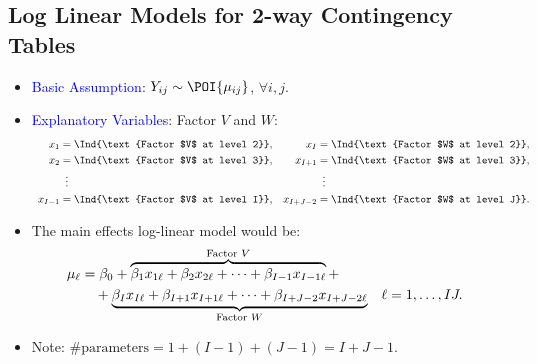 \documentclass[oneside]{book}\usepackage[]{graphicx}\usepackage[svgnames]{xcolor}
\let\log\relax%
\begin{document}
\subsection*{Log Linear Models for 2-way Contingency Tables}
\begin{itemize}
    \item \textcolor{Blue}{Basic Assumption}: $ Y_{ij} \sim \POI{\mu_{ij}} $, $ \forall i,j $.
    \item \textcolor{Blue}{Explanatory Variables}: Factor $V$ and $W$:
          \[ \begin{array}{cc}
                  \begin{aligned}
                      x_1     & =\Ind{\text{Factor $V$ at level 2}}, \\
                      x_2     & =\Ind{\text{Factor $V$ at level 3}}, \\
                              & \vdotswithin{=}                      \\
                      x_{I-1} & =\Ind{\text{Factor $V$ at level I}}, \\
                  \end{aligned} &
                  \begin{aligned}
                      x_I       & =\Ind{\text{Factor $W$ at level 2}}, \\
                      x_{I+1}   & =\Ind{\text{Factor $W$ at level 3}}, \\
                                & \vdotswithin{=}                      \\
                      x_{I+J-2} & =\Ind{\text{Factor $W$ at level J}}. \\
                  \end{aligned}
              \end{array} \]
    \item The main effects log-linear model would be:
          \begin{align*}
              \log{\mu_\ell}
               & =\beta_0+\overbrace{\beta_1x_{1\ell}+\beta_2x_{2\ell}+\cdots+\beta_{I-1}x_{I-1\ell}}^{\text{Factor $V$}}+                               \\
               & \quad+\underbrace{\beta_Ix_{I\ell}+\beta_{I+1}x_{I+1\ell}+\cdots+\beta_{I+J-2}x_{I+J-2\ell}}_{\text{Factor $W$}} &  & \ell=1,\ldots,IJ.
          \end{align*}
    \item Note: $ \text{\# parameters}=1+(I-1)+(J-1)=I+J-1 $.

\end{itemize}
\end{document}
